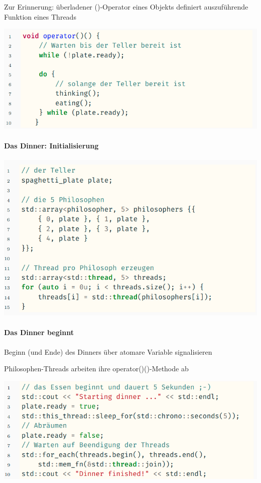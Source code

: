 \documentclass[10pt]{article}
\begin{document}
\begin{itemize*}
  \item Zur Erinnerung: überladener ()-Operator eines Objekts definiert auszuführende Funktion eines Threads
\end{itemize*}
\begin{center}
  \includegraphics[width=0.4\linewidth]{Assets/Programmierparadigmen-code-snippet-31}
\end{center}

\paragraph{Das Dinner: Initialisierung}

\begin{center}
  \includegraphics[width=0.4\linewidth]{Assets/Programmierparadigmen-code-snippet-32}
\end{center}

\paragraph{Das Dinner beginnt}

\begin{itemize*}
  \item Beginn (und Ende) des Dinners über atomare Variable signalisieren
  \item Philosophen-Threads arbeiten ihre operator()()-Methode ab
\end{itemize*}
\begin{center}
  \includegraphics[width=0.4\linewidth]{Assets/Programmierparadigmen-code-snippet-33}
\end{center}
\end{document}
